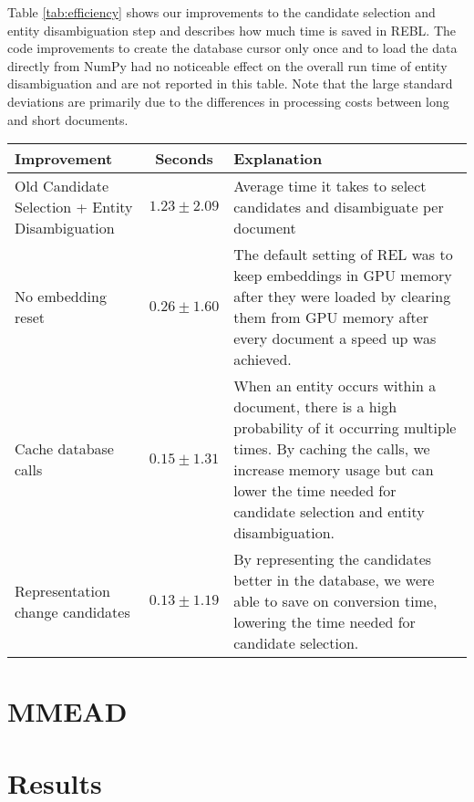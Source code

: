 Table \ref{tab:efficiency} shows our improvements to the candidate selection and entity disambiguation step and describes how much time is saved in REBL. The code improvements to create the database cursor only once and to load the data directly from NumPy had no noticeable effect on the overall run time of entity disambiguation and are not reported in this table. Note that the large standard deviations are primarily due to the differences in processing costs between long and short documents.

\begin{sidewaystable}
	\caption{Efficiency improvements for Candidate Selection and Entity Disambiguation. Improvements are calculated over a sample of 5000 documents using a machine with an Intel Xeon Silver 4214 CPU @ 2.20GHz using two cores with 187GB RAM and a GeForce RTX 2080 Ti (11GB) GPU. Improvements are cumulative; the times shown include the previous improvement as well.}
	\label{tab:efficiency}
	\begin{tabular}{p{6cm} c p{10cm}}
		\toprule
		Improvement & Seconds & Explanation\\
		\midrule
		Old Candidate Selection + Entity Disambiguation & $1.23 \pm 2.09$ & Average time it takes to select candidates and disambiguate per document\\
		\midrule
		No embedding reset & $0.26 \pm 1.60$ & The default setting of REL was to keep embeddings in GPU memory after they were loaded by clearing them from GPU memory after every document a speed up was achieved.\\
		Cache database calls & $0.15 \pm 1.31$ & When an entity occurs within a document, there is a high probability of it occurring multiple times. By caching the calls, we increase memory usage but can lower the time needed for candidate selection and entity disambiguation.  \\
		Representation change candidates & $0.13 \pm 1.19$ & By representing the candidates better in the database, we were able to save on conversion time, lowering the time needed for candidate selection.\\
		\bottomrule
	\end{tabular}
\end{sidewaystable}


\section{MMEAD}

\section{Results}

